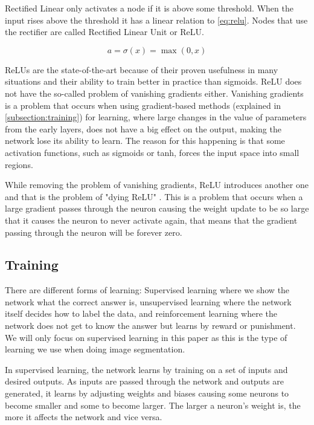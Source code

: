 Rectified Linear only activates a node if it is above some threshold. When the input rises above the threshold it has a linear relation to \autoref{eq:relu}. Nodes that use the rectifier are called Rectified Linear Unit or ReLU. 

\begin{equation}
\label{eq:relu}
a = \sigma(x) = \max(0, x)
\end{equation}


ReLUs are the state-of-the-art because of their proven usefulness in many situations and their ability to train better in practice than sigmoids. ReLU does not have the so-called problem of vanishing gradients either. Vanishing gradients is a problem that occurs when using gradient-based methods (explained in \autoref{subsection:training}) for learning, where large changes in the value of parameters from the early layers, does not have a big effect on the output, making the network lose its ability to learn. The reason for this happening is that some activation functions, such as sigmoids or tanh, forces the input space into small regions. 

While removing the problem of vanishing gradients, ReLU introduces another one and that is the problem of "dying ReLU" \cite{Li}. This is a problem that occurs when a large gradient passes through the neuron causing the weight update to be so large that it causes the neuron to never activate again, that means that the gradient passing through the neuron will be forever zero.


\subsection{Training}\label{subsection:training}
There are different forms of learning: Supervised learning where we show the network what the correct answer is, unsupervised learning where the network itself decides how to label the data, and reinforcement learning where the network does not get to know the answer but learns by reward or punishment. We will only focus on supervised learning in this paper as this is the type of learning we use when doing image segmentation.

In supervised learning, the network learns by training on a set of inputs and desired outputs. As inputs are passed through the network and outputs are generated, it learns by adjusting weights and biases causing some neurons to become smaller and some to become larger. The larger a neuron's weight is, the more it affects the network and vice versa.

